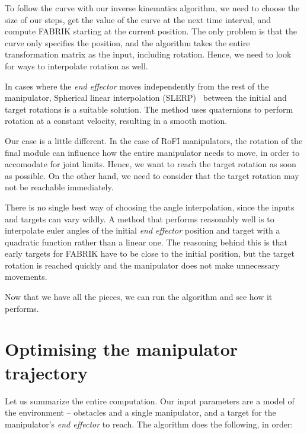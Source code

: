 To follow the curve with our inverse kinematics algorithm, we need to choose the size of our steps, get the value of the curve at the next time interval, and compute FABRIK starting at the current position. The only problem is that the curve only specifies the position, and the algorithm takes the entire transformation matrix as the input, including rotation. Hence, we need to look for ways to interpolate rotation as well.

In cases where the \textit{end effector} moves independently from the rest of the manipulator, Spherical linear interpolation (SLERP)~\cite{slerp} between the initial and target rotations is a suitable solution. The method uses quaternions to perform rotation at a constant velocity, resulting in a smooth motion.

Our case is a little different. In the case of RoFI manipulators, the rotation of the final module can influence how the entire manipulator needs to move, in order to accomodate for joint limits. Hence, we want to reach the target rotation as soon as possible. On the other hand, we need to consider that the target rotation may not be reachable immediately.

There is no single best way of choosing the angle interpolation, since the inputs and targets can vary wildly. A method that performs reasonably well is to interpolate euler angles of the initial \textit{end effector} position and target with a quadratic function rather than a linear one. The reasoning behind this is that early targets for FABRIK have to be close to the initial position, but the target rotation is reached quickly and the manipulator does not make unnecessary movements.

Now that we have all the pieces, we can run the algorithm and see how it performs.

\section{Optimising the manipulator trajectory}

Let us summarize the entire computation. Our input parameters are a model of the environment -- obstacles and a single manipulator, and a target for the manipulator's \textit{end effector} to reach. The algorithm does the following, in order:

